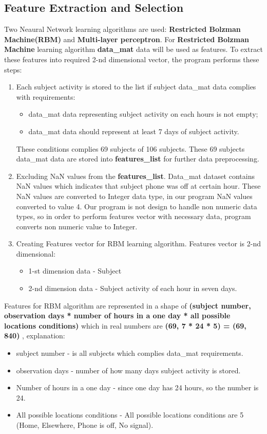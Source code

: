 \documentclass[paper=letter, fontsize=12pt]{article}
\begin{document}
\subsection{Feature Extraction and Selection}
\label{sec:feauturerimpl}
Two Neaural Network learning algorithms are used: \textbf{Restricted Bolzman Machine(RBM)} and \textbf{Multi-layer perceptron}.
For \textbf{Restricted Bolzman Machine} learning algorithm \textbf{data\_mat} data will be used as features. To extract these features into required 2-nd dimensional vector, the program performs these steps:
\begin{enumerate}
\item Each subject activity is stored to the list if subject data\_mat data complies with requirements: 
	\begin{itemize}
		\item data\_mat data representing subject activity on each hours is not empty;
    	\item data\_mat data should represent at least 7 days of subject activity.
    \end{itemize}
These conditions complies 69 subjects of 106 subjects. These 69 subjects data\_mat data are stored into \textbf{features\_list} for further data preprocessing.
\item Excluding NaN values from the \textbf{features\_list}. Data\_mat dataset contains NaN values which indicates that subject phone was off at certain hour. These NaN values are converted to Integer data type, in our program NaN values converted to value 4. Our program is not design to handle non numeric data types, so in order to perform features vector with necessary data, program converts non numeric value to Integer.
\item Creating Features vector for RBM learning algorithm. 
Features vector is 2-nd dimensional:
	\begin{itemize}
 		\item 1-st dimension data - Subject
 		\item 2-nd dimension data - Subject activity of each hour in seven days.
 	\end{itemize}
 
\end{enumerate}
Features for RBM algorithm are represented in a shape of \textbf{(subject number, observation days * number of hours in a one day * all possible locations conditions)} which in real numbers are \textbf{(69, 7 * 24 * 5) = (69, 840)} , explanation:
\begin{itemize}
\item subject number - is all subjects which complies data\_mat requirements.
\item observation days - number of how many days subject activity is stored.
\item Number of hours in a one day - since one day has 24 hours, so the number is 24.
\item All possible locations conditions - All possible locations conditions are 5 (Home, Elsewhere, Phone is off, No signal).
\end{itemize}
\end{document}

